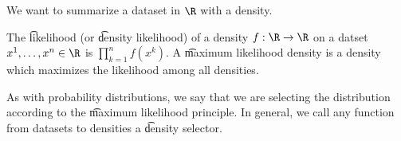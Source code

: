 

We want to summarize a dataset in $\R$ with a density.


The \t{likelihood} (or \t{density likelihood}) of a density $f: \R \to \R$ on a datset $x^1, \dots, x^n \in \R$ is $\prod_{k = 1}^{n} f(x^k)$.
A \t{maximum likelihood density} is a density which maximizes the likelihood among all densities.

As with probability distributions, we say that we are selecting the distribution according to the \t{maximum likelihood principle}.
In general, we call any function from datasets to densities a \t{density selector}.

\blankpage
